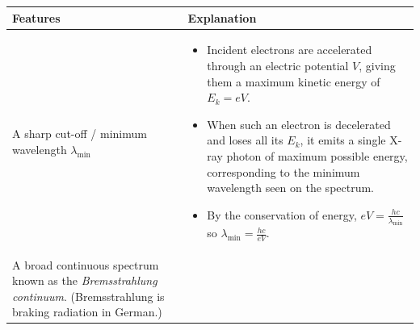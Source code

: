 \documentclass[oneside]{book}
\begin{document}
\begin{longtable}{m{}m{}}
    \toprule
    \begin{minipage}{0.25\textwidth}
        \centering
        Features
    \end{minipage}& 
    \begin{minipage}{0.75\textwidth}
        \centering
        Explanation
    \end{minipage}\\
    \midrule
    A sharp cut-off / minimum wavelength \(\lambda_{\text{min}}\)& 
    \begin{itemize}
        \item Incident electrons are accelerated through an electric potential \(V\), giving them a maximum kinetic energy of \(E_k=eV\). 
        \item When such an electron is decelerated and loses all its \(E_k\), it emits a single X-ray photon of maximum possible energy, corresponding to the minimum wavelength seen on the spectrum. 
        \item By the conservation of energy, \(eV=\frac{hc}{\lambda_{\text{min}}}\) so \(\lambda_{\text{min}}=\frac{hc}{eV}\).
    \end{itemize}\\
    \midrule
    A broad continuous spectrum known as the \emph{Bremsstrahlung continuum}. (Bremsstrahlung is braking radiation in German.)&

\end{longtable}
\end{document}
